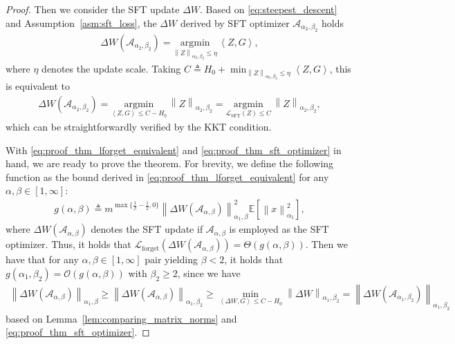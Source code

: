 \documentclass{article}
\theoremstyle{remark}
\newcommand{\Norm}[1]{\left\|#1\right\|}
\newcommand{\dotprod}[2]{\left\langle#1,#2\right\rangle}
\newcommand{\argmin}[1]{\underset{ #1 }{\mathrm{argmin}}\, }
\newcommand{\EE}{\mathbb{E}}
\newcommand{\cO}{\mathcal{O}}
\newcommand{\cA}{\mathcal{A}}
\newcommand{\Lforget}{\mathcal{L}_{\mathrm{forget}}}
\newcommand{\Lsft}{\mathcal{L}_{\mathrm{SFT}}}
\begin{document}
\begin{proof}
    Then we consider the SFT update $\Delta W$. Based on \eqref{eq:steepest_descent} and Assumption~\ref{asm:sft_loss}, the $\Delta W$ derived by SFT optimizer $\cA_{\alpha_2,\beta_2}$ holds
    \begin{align*}
        \Delta W(\cA_{\alpha_2,\beta_2}) = \argmin{\Norm{Z}_{\alpha_2,\beta_2} \le \eta} \dotprod{Z}{G} ,
    \end{align*}
    where $\eta$ denotes the update scale. 
    Taking $C \triangleq H_0+\min_{\Norm{Z}_{\alpha_2,\beta_2} \le \eta}\dotprod{Z}{G}$, this is equivalent to 
    \begin{align}\label{eq:proof_thm_sft_optimizer}
        \Delta W(\cA_{\alpha_2,\beta_2}) = \argmin{\dotprod{Z}{G} \le C-H_0} \Norm{Z}_{\alpha_2,\beta_2} = \argmin{\Lsft(Z) \le C} \Norm{Z}_{\alpha_2,\beta_2} ,
    \end{align}
    which can be straightforwardly verified by the KKT condition.
    
    With \eqref{eq:proof_thm_lforget_equivalent} and \eqref{eq:proof_thm_sft_optimizer} in hand, we are ready to prove the theorem. For brevity, we define the following function as the bound derived in \eqref{eq:proof_thm_lforget_equivalent} for any $\alpha,\beta\in [1,\infty]$:
    \begin{align*}
        g(\alpha,\beta) \triangleq m^{\max\{ \frac{1}{\beta} - \frac{1}{2},0 \} }  \Norm{\Delta W(\cA_{\alpha,\beta})}_{\alpha_1,\beta}^2 \EE\left[ \Norm{x}_{\alpha_1}^2 \right],
    \end{align*}
    where $\Delta W(\cA_{\alpha,\beta})$ denotes the SFT update if $\cA_{\alpha,\beta}$ is employed as the SFT optimizer. Thus, it holds that $\Lforget(\Delta W(\cA_{\alpha,\beta})) = \Theta\left( g(\alpha,\beta) \right)$.
    Then we have that for any $\alpha, \beta \in [1,\infty]$ pair yielding $\beta < 2$, it holds that
    $
        g(\alpha_1,\beta_2) =\cO\left( g(\alpha, \beta) \right)
    $
    with $\beta_2 \ge 2$, since we have
    \begin{align*}
        \Norm{\Delta W(\cA_{\alpha,\beta})}_{\alpha_1,\beta} \ge \Norm{\Delta W(\cA_{\alpha,\beta})}_{\alpha_1,\beta_2} \ge \min_{\dotprod{\Delta W}{G} \le C-H_0} \Norm{\Delta W}_{\alpha_1,\beta_2} = \Norm{\Delta W(\cA_{\alpha_1,\beta_2})}_{\alpha_1,\beta_2} 
    \end{align*}
    based on Lemma~\ref{lem:comparing_matrix_norms} and \eqref{eq:proof_thm_sft_optimizer}.

    


\end{proof}
\end{document}
